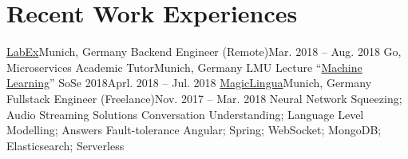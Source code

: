 \section{\textbf{Recent Work Experiences}}
  \resumeSubHeadingListStart
    \resumeSubheading
      {\href{https://labex.io/}{LabEx}}{Munich, Germany}
      {Backend Engineer (Remote)}{Mar. 2018 -- Aug. 2018}
      \resumeItemListStart
          {Go, Microservices}
      \resumeItemListEnd
    \resumeSubheading
      {Academic Tutor}{Munich, Germany}
      {LMU Lecture ``\href{http://www.dbs.ifi.lmu.de/cms/studium_lehre/lehre_master/ml18/index.html}{Machine Learning}'' SoSe 2018}{Aprl. 2018 -- Jul. 2018}
      \resumeItemListStart
      \resumeItemListEnd
    \resumeSubheading
    {\href{https://magiclingua.com/}{MagicLingua}}{Munich, Germany}
    {Fullstack Engineer (Freelance)}{Nov. 2017 -- Mar. 2018}
    \resumeItemListStart
        {Neural Network Squeezing; Audio Streaming Solutions}
        {Conversation Understanding; Language Level Modelling; Answers Fault-tolerance}
        {Angular; Spring; WebSocket; MongoDB; Elasticsearch; Serverless}
    \resumeItemListEnd
  \resumeSubHeadingListEnd